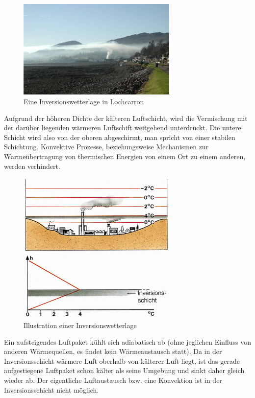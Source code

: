 \documentclass[11pt, a4paper]{article}
\begin{document}
\begin{figure}[h!]
	\centering
	\includegraphics[width=0.7\textwidth]{images/inversio}
	\caption{Eine Inversionswetterlage in Lochcarron \cite{inversio-image}}
\end{figure}
\newpage
Aufgrund der höheren Dichte der kälteren Luftschicht, wird die Vermischung mit der darüber liegenden wärmeren Luftschift weitgehend unterdrückt. Die untere Schicht wird also von der oberen abgeschirmt, man spricht von einer stabilen Schichtung. Konvektive Prozesse, beziehungsweise Mechanismen zur Wärmeübertragung von thermischen Energien von einem Ort zu einem anderen, werden verhindert.\cite{inversion-klett}\cite{inv-wetterlage}\cite{entstehung-inverw} \\

\begin{figure}[h!]
	\centering
	\includegraphics[width=0.7\textwidth]{images/inversion}
	\caption{Illustration einer Inversionswetterlage \cite{inversion-klett-image}}
\end{figure}
Ein aufsteigendes Luftpaket kühlt sich adiabatisch ab (ohne jeglichen Einfluss von anderen Wärmequellen, es findet kein Wärmeaustausch statt). Da in der Inversionsschicht wärmere Luft oberhalb von kälterer Luft liegt, ist das gerade aufgestiegene Luftpaket schon kälter als seine Umgebung und sinkt daher gleich wieder ab. Der eigentliche Luftaustausch bzw. eine Konvektion ist in der Inversionsschicht nicht möglich. \\
\end{document}
